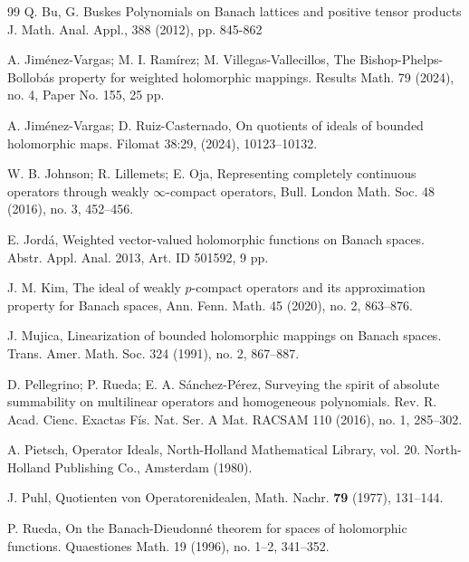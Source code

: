 \documentclass[12pt]{amsart}
\theoremstyle{plain}
\numberwithin{equation}{section}
\begin{document}
\begin{thebibliography}{99}
 Q. Bu, G. Buskes Polynomials on Banach lattices and positive tensor products J. Math. Anal. Appl., 388 (2012), pp. 845-862

  A. Jiménez-Vargas; M. I. Ramírez; M. Villegas-Vallecillos, The Bishop-Phelps-Bollobás property for weighted holomorphic mappings. Results Math. 79 (2024), no. 4, Paper No. 155, 25 pp.

 A. Jim{\'{e}}nez-Vargas; D. Ruiz-Casternado, On
quotients of ideals of bounded holomorphic maps. Filomat 38:29, (2024), 10123--10132.

 W. B. Johnson; R. Lillemets; E. Oja, Representing completely continuous operators through weakly $\infty$-compact operators,
Bull. London Math. Soc. 48 (2016), no. 3, 452--456.


 E. Jord\'a, Weighted vector-valued holomorphic functions on Banach spaces. Abstr. Appl. Anal. 2013, Art. ID 501592, 9 pp.


 J. M. Kim, The ideal of weakly $p$-compact operators and its approximation property for Banach spaces, Ann. Fenn. Math. 45
(2020), no. 2, 863--876.

 J. Mujica,  Linearization of bounded holomorphic mappings on Banach spaces. Trans. Amer. Math. Soc. 324 (1991), no. 2, 867--887.

 D. Pellegrino; P. Rueda; E. A. S\'anchez-P\'erez,  Surveying the spirit of absolute summability on multilinear operators and homogeneous polynomials. Rev. R. Acad. Cienc. Exactas Fís. Nat. Ser. A Mat. RACSAM 110 (2016), no. 1, 285--302.

 A. Pietsch, Operator Ideals, North-Holland
Mathematical Library, vol. 20. North-Holland Publishing Co., Amsterdam
(1980).

 J. Puhl, Quotienten von Operatorenidealen, Math. Nachr. 
\textbf{79} (1977), 131--144.

 P. Rueda,  On the Banach-Dieudonn\'e theorem for spaces of holomorphic functions. Quaestiones Math. 19 (1996), no. 1--2, 341--352.

\end{thebibliography}
\end{document}
